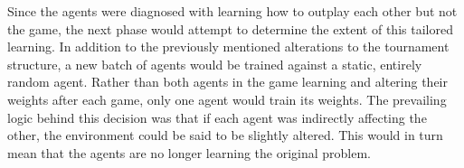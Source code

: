 
Since the agents were diagnosed with learning how to outplay each other
but not the game,
the next phase would attempt to determine the extent of this tailored learning.
%
In addition to the previously mentioned alterations to the tournament structure,
a new batch of agents would be trained against a static, entirely random agent.
%
Rather than both agents in the game learning and altering their weights after
each game,
only one agent would train its weights.
%
The prevailing logic behind this decision was that if each agent was indirectly
affecting the other,
the environment could be said to be slightly altered.
%
This would in turn mean that the agents are no longer learning the original
problem.

